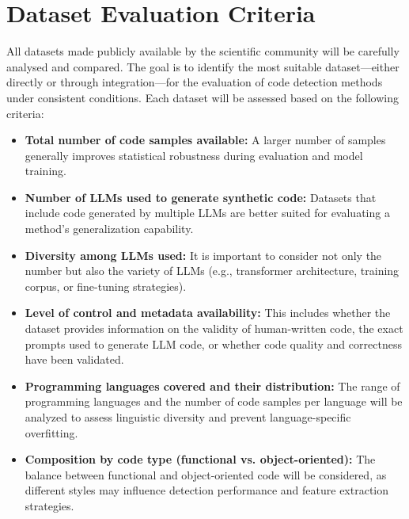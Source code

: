 \clearpage
\section{Dataset Evaluation Criteria}

%



All datasets made publicly available by the scientific 
community will be carefully analysed and compared. 
The goal is to identify the most suitable dataset—either 
directly or through integration—for the evaluation of code 
detection methods under consistent conditions. Each dataset 
will be assessed based on the following criteria:

\begin{itemize}
    \item \textbf{Total number of code samples available:} 
    A larger number of samples generally improves statistical 
    robustness during evaluation and model training.
    
    \item \textbf{Number of LLMs used to generate synthetic code:} 
    Datasets that include code generated by multiple LLMs are better 
    suited for evaluating a method’s generalization capability.
    
    \item \textbf{Diversity among LLMs used:} It is important to 
    consider not only the number but also the variety of LLMs (e.g., 
    transformer architecture, training corpus, or fine-tuning strategies).
    
    \item \textbf{Level of control and metadata availability:} 
    This includes whether the dataset provides information on the 
    validity of human-written code, the exact prompts used to generate 
    LLM code, or whether code quality and correctness have been validated.
    
    \item \textbf{Programming languages covered and their distribution:} 
    The range of programming languages and the number of code samples per 
    language will be analyzed to assess linguistic diversity and prevent 
    language-specific overfitting.
    
    \item \textbf{Composition by code type (functional vs. object-oriented):} 
    The balance between functional and object-oriented code will be considered, 
    as different styles may influence detection performance and feature extraction strategies.
\end{itemize}
